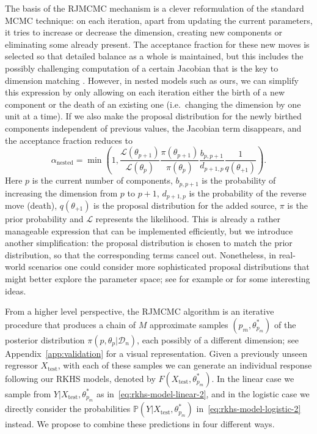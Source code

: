 \documentclass{article}
\numberwithin{equation}{section}
\theoremstyle{plain}
\theoremstyle{definition}
\begin{document}
The basis of the RJMCMC mechanism is a clever reformulation of the standard MCMC technique: on each iteration, apart from updating the current parameters, it tries to increase or decrease the dimension, creating new components or eliminating some already present. The acceptance fraction for these new moves is selected so that detailed balance as a whole is maintained, but this includes the possibly challenging computation of a certain Jacobian that is the key to dimension matching \citep{green1995reversible}. However, in nested models such as ours, we can simplify this expression by only allowing on each iteration either the birth of a new component or the death of an existing one (i.e.~changing the dimension by one unit at a time). If we also make the proposal distribution for the newly birthed components independent of previous values, the Jacobian term disappears, and the acceptance fraction reduces to \citep{brooks2003efficient}
\[
  \alpha_\text{nested} = \min\left(1, \frac{\mathcal{L}(\theta_{p+1})}{\mathcal{L}(\theta_p)}\frac{\pi(\theta_{p+1})}{\pi(\theta_p)}\frac{b_{p, p+1}}{d_{p+1, p}}\frac{1}{q(\theta_{+1})}\right).
\]
Here \(p\) is the current number of components, \(b_{p, p+1}\) is the probability of increasing the dimension from \(p\) to \(p+1\), \(d_{p+1, p}\) is the probability of the reverse move (death), \(q(\theta_{+1})\) is the proposal distribution for the added source, \(\pi\) is the prior probability and \(\mathcal L\) represents the likelihood. This is already a rather manageable expression that can be implemented efficiently, but we introduce another simplification: the proposal distribution is chosen to match the prior distribution, so that the corresponding terms cancel out. Nonetheless, in real-world scenarios one could consider more sophisticated proposal distributions that might better explore the parameter space; see for example \citet{davies2023transport} or \citet{korsakova2024neural} for some interesting ideas.

From a higher level perspective, the RJMCMC algorithm is an iterative procedure that produces a chain of \(M\) approximate samples \((p_m, \theta^*_{p_m})\) of the posterior distribution \(\pi(p, \theta_p| \mathcal D_n)\), each possibly of a different dimension; see Appendix~\ref{app:validation} for a visual representation. Given a previously unseen regressor \(X_{\text{test}}\), with each of these samples we can generate an individual response following our RKHS models, denoted by \(F(X_{\text{test}}, \theta^*_{p_m})\). In the linear case we sample from \(Y | X_{\text{test}}, \theta^*_{p_m}\) as in~\eqref{eq:rkhs-model-linear-2}, and in the logistic case we directly consider the probabilities \(\mathbb{P}(Y|X_{\text{test}},\theta^*_{p_m})\) in~\eqref{eq:rkhs-model-logistic-2} instead. We propose to combine these predictions in four different ways.
\end{document}
